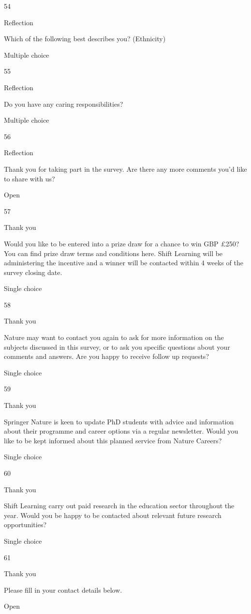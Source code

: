 \documentclass[
]{article}
\begin{document}
54

Reflection

Which of the following best describes you? (Ethnicity)

Multiple choice

55

Reflection

Do you have any caring responsibilities?

Multiple choice

56

Reflection

Thank you for taking part in the survey. Are there any more comments
you'd like to share with us?

Open

57

Thank you

Would you like to be entered into a prize draw for a chance to win GBP
£250? You can find prize draw terms and conditions here. Shift Learning
will be administering the incentive and a winner will be contacted
within 4 weeks of the survey closing date.

Single choice

58

Thank you

Nature may want to contact you again to ask for more information on the
subjects discussed in this survey, or to ask you specific questions
about your comments and answers. Are you happy to receive follow up
requests?

Single choice

59

Thank you

Springer Nature is keen to update PhD students with advice and
information about their programme and career options via a regular
newsletter. Would you like to be kept informed about this planned
service from Nature Careers?

Single choice

60

Thank you

Shift Learning carry out paid research in the education sector
throughout the year. Would you be happy to be contacted about relevant
future research opportunities?

Single choice

61

Thank you

Please fill in your contact details below.

Open
\end{document}

